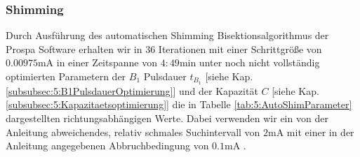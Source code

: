 \documentclass[../../main.tex]{subfiles}
\begin{document}
        \subsubsection*{Shimming}

            Durch Ausführung des automatischen Shimming Bisektionsalgorithmus der Prospa Software \cite[ch. 2.4.3]{doc:EFNMRStudentManual} erhalten wir in $36$ Iterationen mit einer Schrittgröße von $0.00975\si{\milli\ampere}$ in einer Zeitspanne von $4:49$min unter noch nicht vollständig optimierten Parametern der $B_1$ Pulsdauer $t_{B_1}$ [siehe Kap. \ref{subsubsec:5:B1PulsdauerOptimierung}] und der Kapazität $C$ [siehe Kap. \ref{subsubsec:5:Kapazitaetsoptimierung}] die in Tabelle \ref{tab:5:AutoShimParameter} dargestellten richtungsabhängigen Werte. Dabei verwenden wir ein von der Anleitung abweichendes, relativ schmales Suchintervall von $2\si{\milli\ampere}$ mit einer in der Anleitung angegebenen Abbruchbedingung von $0.1\si{\milli\ampere}$ \cite[ch 2.4.3]{doc:EFNMRStudentManual}. 
\end{document}
